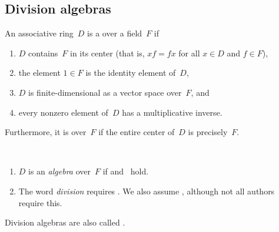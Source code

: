 \subsection{Division algebras}

\begin{defn} \label{DivAlgDefn}
 An associative ring~$D$ is a  over a field~$F$ if%
\noprelistbreak
 \begin{enumerate}
 \item \label{DivAlgDefn-F}
 $D$ contains~$F$ in its center 
 	(that is, $xf = fx$ for all $x \in D$ and $f \in F$),
 \item \label{DivAlgDefn-1}
 the element $1 \in F$ is the identity element of~$D$,
 \item \label{DivAlgDefn-dim}
 $D$ is finite-dimensional as a vector space over~$F$,
 and
 \item \label{DivAlgDefn-inv}
 every nonzero element of~$D$ has a multiplicative
inverse.
 \end{enumerate}
Furthermore, it is  over~$F$ if the entire center of~$D$ is precisely~$F$.
 \end{defn}

\begin{rems} \ 
\noprelistbreak
 \begin{enumerate}
 \item $D$ is an \emph{algebra} over~$F$ if
 and~ hold. 
  \item The word \emph{division} requires
.
We also assume , although not all authors require this.
 \end{enumerate}
 \end{rems}

\begin{terminology}
 Division algebras are also called .
 \end{terminology}

